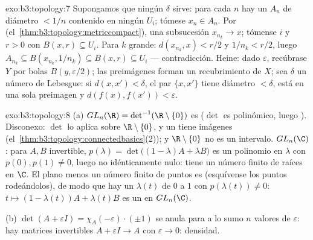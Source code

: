 \begin{solution}{exo:b3:topology:7}
Supongamos que ningún $\delta$ sirve: para cada $n$ hay un $A_n$ de
diámetro $< 1/n$ contenido en ningún $U_i$; tómese $x_n \in
A_n$. Por  (el~\cref{thm:b3:topology:metriccompact}), una
subsucesión $x_{n_k} \to x$; tómense $i$ y $r > 0$ con $B(x,
r) \subseteq U_i$. Para $k$ grande: $d(x_{n_k}, x) < r/2$ y
$1/n_k < r/2$, luego $A_{n_k} \subseteq B(x_{n_k}, 1/n_k)
\subseteq B(x, r) \subseteq U_i$ --- contradicción. Heine: dado
$\varepsilon$, recúbrase $Y$ por bolas $B(y, \varepsilon/2)$; las
preimágenes forman un recubrimiento  de $X$; sea $\delta$ un
número de Lebesgue: si $d(x, x') < \delta$, el par $\{x, x'\}$ tiene
diámetro $< \delta$, está en una sola preimagen y $d(f(x),
f(x')) < \varepsilon$.
\end{solution}

\begin{solution}{exo:b3:topology:8}
(a) $GL_n(\R) = \det^{-1}(\R\setminus\{0\})$ es  ($\det$ es
polinómico, luego ).
Disconexo: $\det$ lo aplica sobre $\R\setminus\{0\}$, y un
 tiene imágenes
(el~\cref{thm:b3:topology:connectedbasics}(2)); y $\R\setminus\{0\}$ no
es un intervalo. $GL_n(\C)$: para $A, B$ invertible,
$p(\lambda) = \det\bigl((1-\lambda)A + \lambda
B\bigr)$ es un polinomio en $\lambda$ con $p(0), p(1) \neq 0$, luego no
idénticamente nulo: tiene un número finito de raíces en $\C$. El plano
menos un número finito de puntos es
 (esquívense
los puntos rodeándolos), de modo que hay un
 $\lambda(t)$ de $0$ a $1$
con $p(\lambda(t)) \neq 0$: $t \mapsto
(1-\lambda(t))A + \lambda(t)B$ es un
 en $GL_n(\C)$.

(b) $\det(A + \varepsilon I) = \chi_A(-\varepsilon)\cdot(\pm1)$
se anula para a lo sumo $n$ valores de $\varepsilon$: hay matrices
invertibles $A + \varepsilon I \to A$ con $\varepsilon \to 0$: densidad.
\end{solution}


